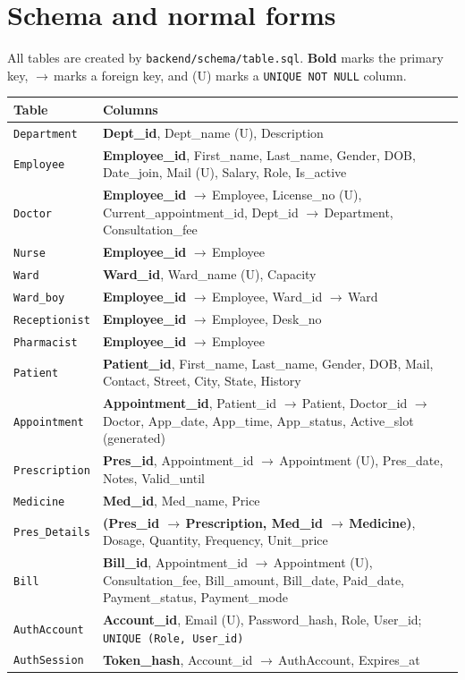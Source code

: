 \documentclass[11pt,a4paper]{article}
\newcommand{\code}[1]{\texttt{#1}}
\newcommand{\fk}{$\rightarrow$\,}
\begin{document}
\section{Schema and normal forms}

All tables are created by \code{backend/schema/table.sql}. \textbf{Bold} marks the primary key, \fk marks a foreign key, and (U) marks a \code{UNIQUE NOT NULL} column.

\begin{center}
\small
\begin{tabularx}{\textwidth}{l L}
\toprule
\textbf{Table} & \textbf{Columns} \\
\midrule
\code{Department}   & \textbf{Dept\_id}, Dept\_name (U), Description \\
\code{Employee}     & \textbf{Employee\_id}, First\_name, Last\_name, Gender, DOB, Date\_join, Mail (U), Salary, Role, Is\_active \\
\code{Doctor}       & \textbf{Employee\_id} \fk Employee, License\_no (U), Current\_appointment\_id, Dept\_id \fk Department, Consultation\_fee \\
\code{Nurse}        & \textbf{Employee\_id} \fk Employee \\
\code{Ward}         & \textbf{Ward\_id}, Ward\_name (U), Capacity \\
\code{Ward\_boy}    & \textbf{Employee\_id} \fk Employee, Ward\_id \fk Ward \\
\code{Receptionist} & \textbf{Employee\_id} \fk Employee, Desk\_no \\
\code{Pharmacist}   & \textbf{Employee\_id} \fk Employee \\
\code{Patient}      & \textbf{Patient\_id}, First\_name, Last\_name, Gender, DOB, Mail, Contact, Street, City, State, History \\
\code{Appointment}  & \textbf{Appointment\_id}, Patient\_id \fk Patient, Doctor\_id \fk Doctor, App\_date, App\_time, App\_status, Active\_slot (generated) \\
\code{Prescription} & \textbf{Pres\_id}, Appointment\_id \fk Appointment (U), Pres\_date, Notes, Valid\_until \\
\code{Medicine}     & \textbf{Med\_id}, Med\_name, Price \\
\code{Pres\_Details} & \textbf{(Pres\_id \fk Prescription, Med\_id \fk Medicine)}, Dosage, Quantity, Frequency, Unit\_price \\
\code{Bill}         & \textbf{Bill\_id}, Appointment\_id \fk Appointment (U), Consultation\_fee, Bill\_amount, Bill\_date, Paid\_date, Payment\_status, Payment\_mode \\
\code{AuthAccount}  & \textbf{Account\_id}, Email (U), Password\_hash, Role, User\_id; \code{UNIQUE (Role, User\_id)} \\
\code{AuthSession}  & \textbf{Token\_hash}, Account\_id \fk AuthAccount, Expires\_at \\
\bottomrule
\end{tabularx}
\end{center}
\end{document}
